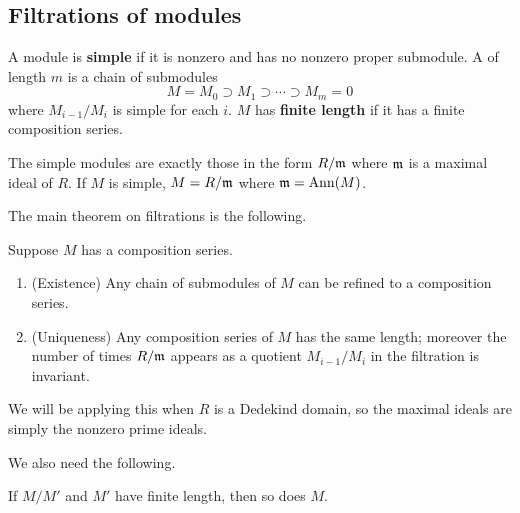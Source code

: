 \subsection{Filtrations of modules}
\begin{df}
A module is \textbf{simple} if it is nonzero and has no nonzero proper submodule. A  of length $m$ is a chain of submodules
\[
M=M_0\supset M_1\supset\cdots \supset M_m=0
\]
where $M_{i-1}/M_i$ is simple for each $i$. $M$ has \textbf{finite length} if it has a finite composition series.
\end{df}
\begin{pr}
The simple modules are exactly those in the form $R/\mathfrak{m}$ where $\mathfrak{m}$ is a maximal ideal of $R$. If $M$ is simple, $M=R/\mathfrak{m}$ where $\mathfrak{m}=\operatorname{Ann}(M)$.
\end{pr}
The main theorem on filtrations is the following.
\begin{thm}
Suppose $M$ has a composition series.
\begin{enumerate}
\item (Existence) Any chain of submodules of $M$ can be refined to a composition series.
\item (Uniqueness) Any composition series of $M$ has the same length; moreover the number of times $R/\mathfrak{m}$ appears as a quotient $M_{i-1}/M_i$ in the filtration is invariant.
\end{enumerate}
\end{thm}
We will be applying this when $R$ is a Dedekind domain, so the maximal ideals are simply the nonzero prime ideals.

We also need the following.
\begin{pr}
If $M/M'$ and $M'$ have finite length, then so does $M$.
\end{pr}
